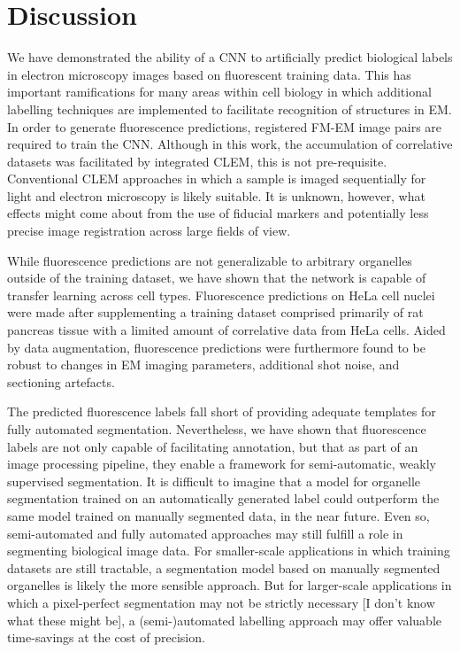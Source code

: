 \clearpage
\section{Discussion}
\label{sec:4.3_discussion}

We have demonstrated the ability of a CNN to artificially predict biological labels in electron microscopy images based on fluorescent training data. This has important ramifications for many areas within cell biology in which additional labelling techniques are implemented to facilitate recognition of structures in EM. 
In order to generate fluorescence predictions, registered FM-EM image pairs are required to train the CNN. Although in this work, the accumulation of correlative datasets was facilitated by integrated CLEM, this is not pre-requisite. Conventional CLEM approaches in which a sample is imaged sequentially for light and electron microscopy is likely suitable. It is unknown, however, what effects might come about from the use of fiducial markers and potentially less precise image registration across large fields of view.

While fluorescence predictions are not generalizable to arbitrary organelles outside of the training dataset, we have shown that the network is capable of transfer learning across cell types. Fluorescence predictions on HeLa cell nuclei were made after supplementing a training dataset comprised primarily of rat pancreas tissue with a limited amount of correlative data from HeLa cells. Aided by data augmentation, fluorescence predictions were furthermore found to be robust to changes in EM imaging parameters, additional shot noise, and sectioning artefacts.

The predicted fluorescence labels fall short of providing adequate templates for fully automated segmentation. Nevertheless, we have shown that fluorescence labels are not only capable of facilitating annotation, but that as part of an image processing pipeline, they enable a framework for semi-automatic, weakly supervised segmentation. 
It is difficult to imagine that a model for organelle segmentation trained on an automatically generated label could outperform the same model trained on manually segmented data, in the near future.
Even so, semi-automated and fully automated approaches may still fulfill a role in segmenting biological image data.
For smaller-scale applications in which training datasets are still tractable, a segmentation model based on manually segmented organelles is likely the more sensible approach. But for larger-scale applications in which a pixel-perfect segmentation may not be strictly necessary [I don't know what these might be], a (semi-)automated labelling approach may offer valuable time-savings at the cost of precision.

